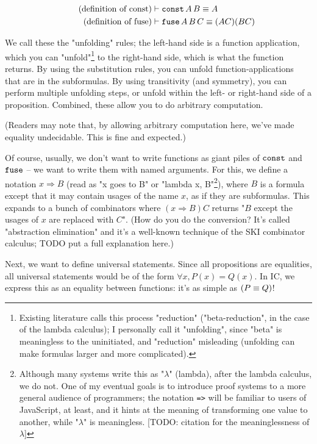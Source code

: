 \documentclass{article}
\begin{document}
  \begin{align*}
    \tag{definition of const}\label{def_const}
    &\vdash \operatorname{\texttt{const}} A\, B \equiv A \\
    \tag{definition of fuse}\label{def_fuse}
    &\vdash \operatorname{\texttt{fuse}} A\, B\, C \equiv (AC)(BC)
  \end{align*}
  
  We call these the "unfolding" rules; the left-hand side is a function application, which you can "unfold"\footnote{Existing literature calls this process "reduction" ("beta-reduction", in the case of the lambda calculus); I personally call it "unfolding", since "beta" is meaningless to the uninitiated, and "reduction" misleading (unfolding can make formulas larger and more complicated). } to the right-hand side, which is what the function returns. By using the substitution rules, you can unfold function-applications that are in the subformulas. By using transitivity (and symmetry), you can perform multiple unfolding steps, or unfold within the left- or right-hand side of a proposition. Combined, these allow you to do arbitrary computation.
  
  (Readers may note that, by allowing arbitrary computation here, we've made equality undecidable. This is fine and expected.)

  \newcommand{\nameabst}[1]{#1 \Rightarrow}

  Of course, usually, we don't want to write functions as giant piles of $\operatorname{\texttt{const}}$ and $\operatorname{\texttt{fuse}}$ – we want to write them with named arguments. For this, we define a notation $\nameabst{x} B$ (read as "x goes to B" or "lambda x, B"\footnote{Although many systems write this as "$\lambda$" (lambda), after the lambda calculus, we do not. One of my eventual goals is to introduce proof systems to a more general audience of programmers; the notation \texttt{=>} will be familiar to users of JavaScript, at least, and it hints at the meaning of transforming one value to another, while "$\lambda$" is meaningless. [TODO: citation for the meaninglessness of $\lambda$]}), where $B$ is a formula except that it may contain usages of the name $x$, as if they are subformulas. This expands to a bunch of combinators where $(\nameabst{x} B) C$ returns "$B$ except the usages of $x$ are replaced with $C$". (How do you do the conversion? It's called "abstraction elimination" and it's a well-known technique of the SKI combinator calculus; TODO put a full explanation here.)
  
  Next, we want to define universal statements. Since all propositions are equalities, all universal statements would be of the form $\forall x, P(x) = Q(x)$. In IC, we express this as an equality between functions: it's as simple as $(P \equiv Q)$!
  
\end{document}

